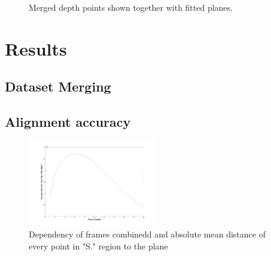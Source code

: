 \documentclass[12pt,a4paper,onecolumn]{article}
\begin{document}
\begin{figure}[!ht]
    \centering
      \caption{Merged depth points shown together with fitted planes.}
\end{figure}
\section{Results}

\subsection{Dataset Merging}

\subsection{Alignment accuracy}
\begin{figure}[!ht]
  \centering
  \includegraphics[width=0.5\textwidth]{figs/plane_angle_error_versus_foundation_plane}
  \caption{Dependency of frames combinedd and absolute mean distance of every point in "S." region to the plane}
  \label{fig:plane_angle_error_versus_foundation_plane}
\end{figure}
\end{document}
